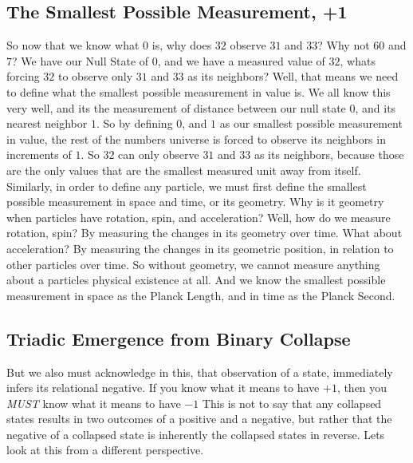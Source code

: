 \documentclass[11pt]{article}
\begin{document}
    \subsection{The Smallest Possible Measurement, +1}
        So now that we know what $0$ is, why does $32$ observe $31$ and $33$? Why not $60$ and $7$?
        We have our Null State of $0$, and we have a measured value of $32$, whats forcing $32$ to observe only $31$ and $33$ as its neighbors?
        Well, that means we need to define what the smallest possible measurement in value is.
        We all know this very well, and its the measurement of distance between our null state $0$, and its nearest neighbor $1$.
        So by defining $0$, and $1$ as our smallest possible measurement in value, the rest of the numbers universe is forced to observe its neighbors in increments of $1$.
        So $32$ can only observe $31$ and $33$ as its neighbors, because those are the only values that are the smallest measured unit away from itself.
        Similarly, in order to define any particle, we must first define the smallest possible measurement in space and time, or its geometry.
        Why is it geometry when particles have rotation, spin, and acceleration?
        Well, how do we measure rotation, spin?
        By measuring the changes in its geometry over time.
        What about acceleration?
        By measuring the changes in its geometric position, in relation to other particles over time.
        So without geometry, we cannot measure anything about a particles physical existence at all.
        And we know the smallest possible measurement in space as the Planck Length, and in time as the Planck Second.

    \subsection{Triadic Emergence from Binary Collapse}
        \hspace{1em}
        But we also must acknowledge in this, that observation of a state, immediately infers its relational negative.
        If you know what it means to have $+1$, then you \emph{MUST} know what it means to have $-1$
        This is not to say that any collapsed states results in two outcomes of a positive and a negative,
        but rather that the negative of a collapsed state is inherently the collapsed states in reverse.
        Lets look at this from a different perspective.
\end{document}
